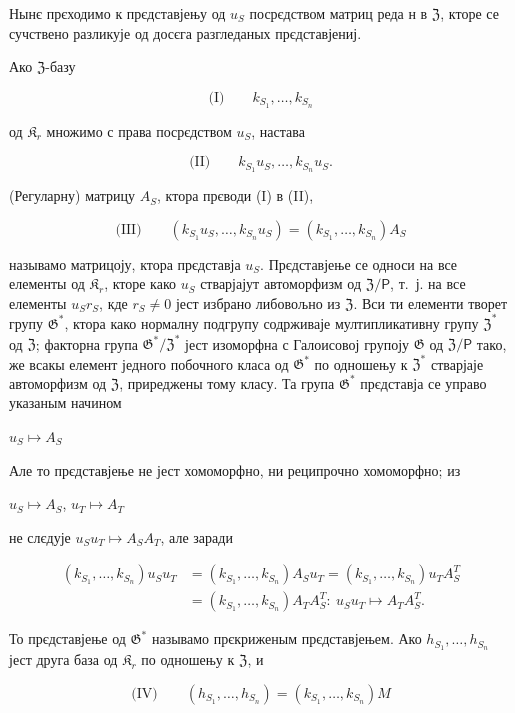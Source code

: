 \documentclass[11pt]{article}
\begin{document}
Нынє прєходимо к прєдставјењу од \(u_S\) посрєдством матриц реда н в \(\mathfrak{Z}\), кторе се сучствено разликује од досєга разгледаных прєдставјениј.

Ако \(\mathfrak Z\)-базу

\[
\text{(I)}\qquad k_{S_1}, \ldots, k_{S_n}
\]

од \(\mathfrak K_r\) множимо с права посрєдством \(u_S\), настава

\[
\text{(II)}\qquad k_{S_1}u_S, \ldots, k_{S_n}u_S.
\]

(Регуларну) матрицу \(A_S\), ктора прєводи (I) в (II),

\[
\text{(III)}\qquad (k_{S_1}u_S, \ldots, k_{S_n}u_S) = (k_{S_1}, \ldots, k_{S_n})A_S
\]

называмо матрицоју, ктора прєдставја \(u_S\). Прєдставјење се односи на все елементы од \(\mathfrak K_{r}\), кторе како \(u_S\) стварјајут автоморфизм од \(\mathfrak Z/\mathsf{P}\), т.~ј. на все елементы \(u_Sr_S\), кде \(r_S \neq 0\) јест избрано либовољно из \(\mathfrak Z\). Вси ти елементи творет групу \(\mathfrak G^*\), ктора како нормалну подгрупу содрживаје мултипликативну групу \(\mathfrak Z^*\) од \(\mathfrak Z\); факторна група \(\mathfrak G^*/\mathfrak Z^*\) јест изоморфна с Галоисовој групоју \(\mathfrak G\) од \(\mathfrak Z/\mathsf{P}\) тако, же всакы елемент једного побочного класа од \(\mathfrak G^*\) по одношењу к \(\mathfrak Z^*\) стварјаје автоморфизм од \(\mathfrak Z\), приреджены тому класу. Та група \(\mathfrak G^*\) прєдставја се управо указаным начином

\(u_S \mapsto A_S\)

Але то прєдставјење не јест хомоморфно, ни реципрочно хомоморфно; из

\(u_S \mapsto A_S\), \(u_T \mapsto A_T\)

не слєдује \(u_Su_T \mapsto A_SA_T\), але заради

\[
\begin{aligned}
(k_{S_1}, \ldots, k_{S_n})u_Su_T
&=(k_{S_1}, \ldots, k_{S_n})A_Su_T
=(k_{S_1}, \ldots, k_{S_n})u_TA_S^T\\
&=(k_{S_1}, \ldots, k_{S_n})A_TA_S^T:\ u_Su_T\mapsto A_TA_S^T.
\end{aligned}
\]

То прєдставјење од \(\mathfrak{G}^*\) называмо прєкриженым прєдставјењем. Ако \(h_{S_1}, \ldots, h_{S_n}\) јест друга база од \(\mathfrak{K}_r\) по одношењу к \(\mathfrak{Z}\), и

\[
\text{(IV)}\qquad (h_{S_1}, \ldots, h_{S_n}) = (k_{S_1}, \ldots, k_{S_n})M
\]
\end{document}
